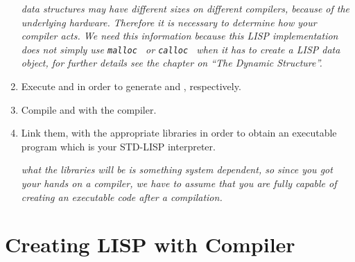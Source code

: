 \begin{enumerate}
      {\em  data  structures  may  have  different  sizes  on  different \C
       compilers, because of  the  underlying  hardware.  Therefore  it  is
       necessary  to  determine  how  your  compiler  acts.  We  need  this
       information because this LISP implementation does not simply  use
       {\tt  malloc }  or  {\tt calloc } when it has to create a LISP data
       object, for  further  details see the chapter on ``The Dynamic
       Structure''.
      }
\item
      Execute  and  in order to generate 
      and , respectively.
\item
      Compile  and  with the \C compiler.
\item Link them,
      with the appropriate libraries in order to obtain an executable
      program which is your STD-LISP interpreter.

      {\em what the libraries will be is  something  system  dependent,  so
       since  you  got  your hands on a \C compiler, we have to assume that
       you  are  fully  capable  of  creating  an  executable  code   after
      a \C compilation.       }
\end{enumerate}

\section{Creating LISP with Compiler}

